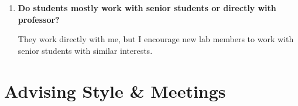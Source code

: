 \documentclass{article}
\begin{document}
\begin{enumerate}[label=\arabic*.]
    As examples, Didier works on Complexity analysis. KimHao worked analyzing build systems, and also complexity analysis and invariant generation. Hai works on DNN verification. Linhan works on DNN testing. Hai, Linhan, and Nguyen often talk to each other as their projects involve neural networks. Long does not work with verification but contributes ideas and expertise as he knows ML systems well. And everyone contributes to fun web apps (e.g., \href{https://roars.dev/cspicks}{CSPicks} by Azan).

    \item \textbf{Do students mostly work with senior students or directly with professor?}  

    They work directly with me, but I encourage new lab members to work with senior students with similar interests.
\end{enumerate}

\section{Advising Style \& Meetings}
\end{document}
